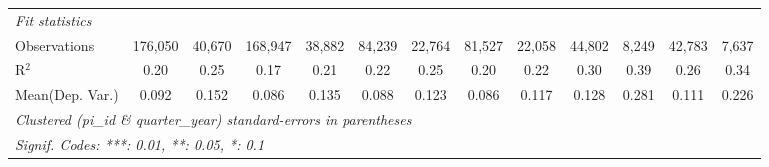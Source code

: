 \begin{tabular}{lcccccccccccc}
   \midrule
   \emph{Fit statistics}\\
   Observations                                               & 176,050        & 40,670         & 168,947        & 38,882        & 84,239         & 22,764         & 81,527         & 22,058         & 44,802         & 8,249         & 42,783        & 7,637\\  
   R$^2$                                                      & 0.20           & 0.25           & 0.17           & 0.21          & 0.22           & 0.25           & 0.20           & 0.22           & 0.30           & 0.39          & 0.26          & 0.34\\  
Mean(Dep. Var.) & 0.092 & 0.152 & 0.086 & 0.135 & 0.088 & 0.123 & 0.086 & 0.117 & 0.128 & 0.281 & 0.111 & 0.226 \\
   \midrule \midrule
   \multicolumn{13}{l}{\emph{Clustered (pi\_id \& quarter\_year) standard-errors in parentheses}}\\
   \multicolumn{13}{l}{\emph{Signif. Codes: ***: 0.01, **: 0.05, *: 0.1}}\\
\end{tabular}
\par\endgroup
